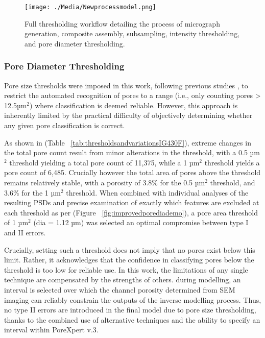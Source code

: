 \documentclass[3p,twocolumn]{elsarticle}
\begin{document}
\begin{figure}[!htbp]
    \centering
    \texttt{[image: ./Media/Newprocessmodel.png]}
    \caption{Full thresholding workflow detailing the process of micrograph generation,
     composite assembly, subsampling, intensity thresholding, and pore diameter thresholding.}
    \label{fig:Final Workflow}
\end{figure}

	\subsubsection{Pore Diameter Thresholding}
    
  Pore size thresholds were imposed in this work, following previous studies
  \citep{Taylor2016, Huang2019, Kane2011a}, to restrict the automated
  recognition of pores to a range (i.e., only counting pores > 12.5µm\(^2\))
  where classification is deemed reliable. However, this approach is inherently
  limited by the practical difficulty of objectively determining whether any
  given pore classification is correct.
      
  As shown in (Table ~\ref{tab:thresholdsandvariationsIG430F}), extreme changes
  in the total pore count result from minor alterations in the threshold, with a
  0.5 µm\(^2\) threshold yielding a total pore count of 11,375, while a 1
  µm\(^2\) threshold yields a pore count of 6,485. Crucially however the total
  area of pores above the threshold remains relatively stable, with a porosity
  of 3.8\% for the 0.5 µm\(^2\) threshold, and 3.6\% for the 1 µm\(^2\)
  threshold. When combined with individual analyses of the resulting PSDs and
  precise examination of exactly which features are excluded at each threshold
  as per (Figure ~\ref{fig:improvedporediademo}), a pore area threshold of 1
  µm\(^2\) (dia = 1.12 µm) was selected an optimal compromise between type I and
  II errors.

   Crucially, setting such a threshold does not imply that no pores exist below
   this limit. Rather, it acknowledges that the confidence in classifying pores
   below the threshold is too low for reliable use. In this work, the
   limitations of any single technique are compensated by the strengths of
   others. during modelling, an interval is selected over which the channel
   porosity determined from SEM imaging can reliably constrain the outputs of
   the inverse modelling process. Thus, no type II errors are introduced in the
   final model due to pore size thresholding, thanks to the combined use of
   alternative techniques and the ability to specify an interval within
   PoreXpert v.3.
\end{document}
